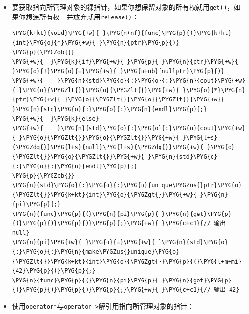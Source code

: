 \begin{itemize}

\item 要获取指向所管理对象的裸指针，如果你想保留对象的所有权就用\texttt{get()}，如果你想连所有权一并放弃就用\texttt{release()}：



\begin{codeblockbg}
\begin{Verbatim}[commandchars=\\\{\},breaklines=true,breakanywhere=true,fontsize=\codefont,xleftmargin=17bp]
\PYG{k+kt}{void}\PYG{+w}{ }\PYG{n+nf}{func}\PYG{p}{(}\PYG{k+kt}{int}\PYG{o}{*}\PYG{+w}{ }\PYG{n}{ptr}\PYG{p}{)}
\PYG{p}{\PYGZob{}}
\PYG{+w}{  }\PYG{k}{if}\PYG{+w}{ }\PYG{p}{(}\PYG{n}{ptr}\PYG{+w}{ }\PYG{o}{!}\PYG{o}{=}\PYG{+w}{ }\PYG{n+nb}{nullptr}\PYG{p}{)}
\PYG{+w}{    }\PYG{n}{std}\PYG{o}{:}\PYG{o}{:}\PYG{n}{cout}\PYG{+w}{ }\PYG{o}{\PYGZlt{}}\PYG{o}{\PYGZlt{}}\PYG{+w}{ }\PYG{o}{*}\PYG{n}{ptr}\PYG{+w}{ }\PYG{o}{\PYGZlt{}}\PYG{o}{\PYGZlt{}}\PYG{+w}{ }\PYG{n}{std}\PYG{o}{:}\PYG{o}{:}\PYG{n}{endl}\PYG{p}{;}
\PYG{+w}{  }\PYG{k}{else}
\PYG{+w}{    }\PYG{n}{std}\PYG{o}{:}\PYG{o}{:}\PYG{n}{cout}\PYG{+w}{ }\PYG{o}{\PYGZlt{}}\PYG{o}{\PYGZlt{}}\PYG{+w}{ }\PYG{l+s}{\PYGZdq{}}\PYG{l+s}{null}\PYG{l+s}{\PYGZdq{}}\PYG{+w}{ }\PYG{o}{\PYGZlt{}}\PYG{o}{\PYGZlt{}}\PYG{+w}{ }\PYG{n}{std}\PYG{o}{:}\PYG{o}{:}\PYG{n}{endl}\PYG{p}{;}
\PYG{p}{\PYGZcb{}}
\PYG{n}{std}\PYG{o}{:}\PYG{o}{:}\PYG{n}{unique\PYGZus{}ptr}\PYG{o}{\PYGZlt{}}\PYG{k+kt}{int}\PYG{o}{\PYGZgt{}}\PYG{+w}{ }\PYG{n}{pi}\PYG{p}{;}
\PYG{n}{func}\PYG{p}{(}\PYG{n}{pi}\PYG{p}{.}\PYG{n}{get}\PYG{p}{(}\PYG{p}{)}\PYG{p}{)}\PYG{p}{;}\PYG{+w}{ }\PYG{c+c1}{// 输出 null}
\PYG{n}{pi}\PYG{+w}{ }\PYG{o}{=}\PYG{+w}{ }\PYG{n}{std}\PYG{o}{:}\PYG{o}{:}\PYG{n}{make\PYGZus{}unique}\PYG{o}{\PYGZlt{}}\PYG{k+kt}{int}\PYG{o}{\PYGZgt{}}\PYG{p}{(}\PYG{l+m+mi}{42}\PYG{p}{)}\PYG{p}{;}
\PYG{n}{func}\PYG{p}{(}\PYG{n}{pi}\PYG{p}{.}\PYG{n}{get}\PYG{p}{(}\PYG{p}{)}\PYG{p}{)}\PYG{p}{;}\PYG{+w}{ }\PYG{c+c1}{// 输出 42}
\end{Verbatim}
\end{codeblockbg}



\item 使用\texttt{operator*}与\texttt{operator->}解引用指向所管理对象的指针：




\end{itemize}
